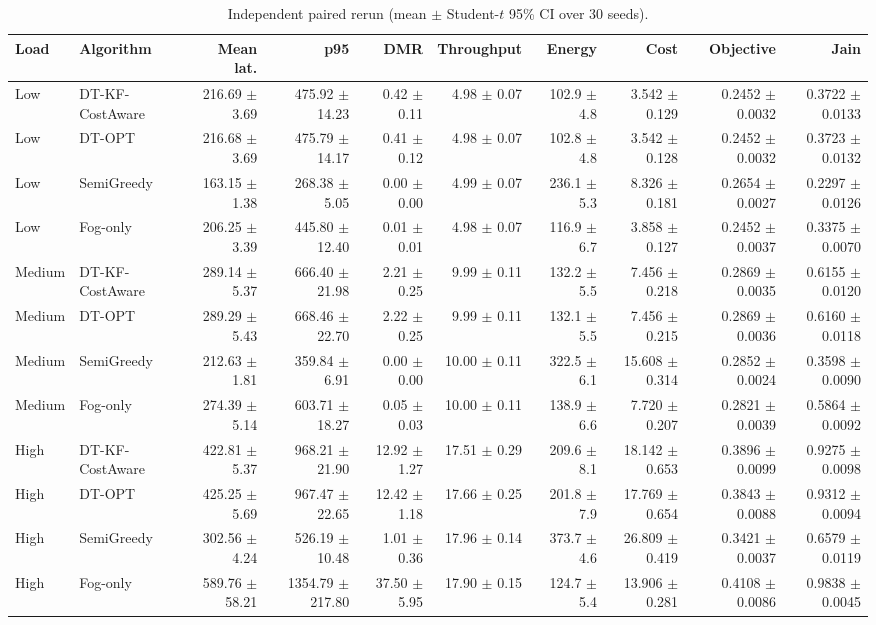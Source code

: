 \begin{table}[t]
\centering
\caption{Independent paired rerun (mean $\pm$ Student-$t$ 95\% CI over 30 seeds).}
\label{tab:independent_main_results}
\scriptsize
\setlength{\tabcolsep}{1.25pt}
\begin{tabular}{llrrrrrrrr}
\toprule
Load & Algorithm & Mean lat. & p95 & DMR & Throughput & Energy & Cost & Objective & Jain \\
\midrule
Low & DT-KF-CostAware & 216.69 $\pm$ 3.69 & 475.92 $\pm$ 14.23 & 0.42 $\pm$ 0.11 & 4.98 $\pm$ 0.07 & 102.9 $\pm$ 4.8 & 3.542 $\pm$ 0.129 & 0.2452 $\pm$ 0.0032 & 0.3722 $\pm$ 0.0133 \\
Low & DT-OPT & 216.68 $\pm$ 3.69 & 475.79 $\pm$ 14.17 & 0.41 $\pm$ 0.12 & 4.98 $\pm$ 0.07 & 102.8 $\pm$ 4.8 & 3.542 $\pm$ 0.128 & 0.2452 $\pm$ 0.0032 & 0.3723 $\pm$ 0.0132 \\
Low & SemiGreedy & 163.15 $\pm$ 1.38 & 268.38 $\pm$ 5.05 & 0.00 $\pm$ 0.00 & 4.99 $\pm$ 0.07 & 236.1 $\pm$ 5.3 & 8.326 $\pm$ 0.181 & 0.2654 $\pm$ 0.0027 & 0.2297 $\pm$ 0.0126 \\
Low & Fog-only & 206.25 $\pm$ 3.39 & 445.80 $\pm$ 12.40 & 0.01 $\pm$ 0.01 & 4.98 $\pm$ 0.07 & 116.9 $\pm$ 6.7 & 3.858 $\pm$ 0.127 & 0.2452 $\pm$ 0.0037 & 0.3375 $\pm$ 0.0070 \\
\midrule
Medium & DT-KF-CostAware & 289.14 $\pm$ 5.37 & 666.40 $\pm$ 21.98 & 2.21 $\pm$ 0.25 & 9.99 $\pm$ 0.11 & 132.2 $\pm$ 5.5 & 7.456 $\pm$ 0.218 & 0.2869 $\pm$ 0.0035 & 0.6155 $\pm$ 0.0120 \\
Medium & DT-OPT & 289.29 $\pm$ 5.43 & 668.46 $\pm$ 22.70 & 2.22 $\pm$ 0.25 & 9.99 $\pm$ 0.11 & 132.1 $\pm$ 5.5 & 7.456 $\pm$ 0.215 & 0.2869 $\pm$ 0.0036 & 0.6160 $\pm$ 0.0118 \\
Medium & SemiGreedy & 212.63 $\pm$ 1.81 & 359.84 $\pm$ 6.91 & 0.00 $\pm$ 0.00 & 10.00 $\pm$ 0.11 & 322.5 $\pm$ 6.1 & 15.608 $\pm$ 0.314 & 0.2852 $\pm$ 0.0024 & 0.3598 $\pm$ 0.0090 \\
Medium & Fog-only & 274.39 $\pm$ 5.14 & 603.71 $\pm$ 18.27 & 0.05 $\pm$ 0.03 & 10.00 $\pm$ 0.11 & 138.9 $\pm$ 6.6 & 7.720 $\pm$ 0.207 & 0.2821 $\pm$ 0.0039 & 0.5864 $\pm$ 0.0092 \\
\midrule
High & DT-KF-CostAware & 422.81 $\pm$ 5.37 & 968.21 $\pm$ 21.90 & 12.92 $\pm$ 1.27 & 17.51 $\pm$ 0.29 & 209.6 $\pm$ 8.1 & 18.142 $\pm$ 0.653 & 0.3896 $\pm$ 0.0099 & 0.9275 $\pm$ 0.0098 \\
High & DT-OPT & 425.25 $\pm$ 5.69 & 967.47 $\pm$ 22.65 & 12.42 $\pm$ 1.18 & 17.66 $\pm$ 0.25 & 201.8 $\pm$ 7.9 & 17.769 $\pm$ 0.654 & 0.3843 $\pm$ 0.0088 & 0.9312 $\pm$ 0.0094 \\
High & SemiGreedy & 302.56 $\pm$ 4.24 & 526.19 $\pm$ 10.48 & 1.01 $\pm$ 0.36 & 17.96 $\pm$ 0.14 & 373.7 $\pm$ 4.6 & 26.809 $\pm$ 0.419 & 0.3421 $\pm$ 0.0037 & 0.6579 $\pm$ 0.0119 \\
High & Fog-only & 589.76 $\pm$ 58.21 & 1354.79 $\pm$ 217.80 & 37.50 $\pm$ 5.95 & 17.90 $\pm$ 0.15 & 124.7 $\pm$ 5.4 & 13.906 $\pm$ 0.281 & 0.4108 $\pm$ 0.0086 & 0.9838 $\pm$ 0.0045 \\
\midrule
\bottomrule
\end{tabular}
\end{table}

